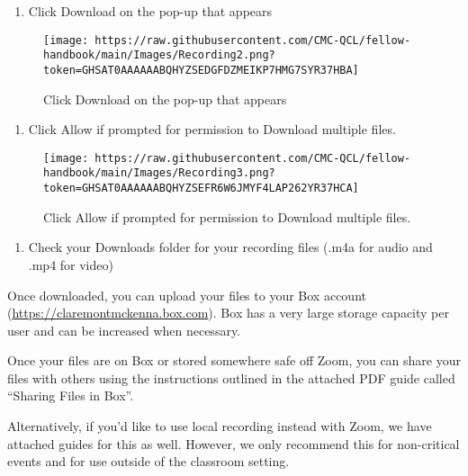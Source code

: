 \documentclass[
]{book}
\providecommand{\tightlist}{%
  \setlength{\itemsep}{0pt}\setlength{\parskip}{0pt}}
\begin{document}
\begin{enumerate}
\def\labelenumi{\arabic{enumi}.}
\setcounter{enumi}{3}
\tightlist
\item
  Click Download on the pop-up that appears
\end{enumerate}

\begin{figure}
\centering
\texttt{[image: https://raw.githubusercontent.com/CMC-QCL/fellow-handbook/main/Images/Recording2.png?token=GHSAT0AAAAAABQHYZSEDGFDZMEIKP7HMG7SYR37HBA]}
\caption{Click Download on the pop-up that appears}
\end{figure}

\begin{enumerate}
\def\labelenumi{\arabic{enumi}.}
\setcounter{enumi}{4}
\tightlist
\item
  Click Allow if prompted for permission to Download multiple files.
\end{enumerate}

\begin{figure}
\centering
\texttt{[image: https://raw.githubusercontent.com/CMC-QCL/fellow-handbook/main/Images/Recording3.png?token=GHSAT0AAAAAABQHYZSEFR6W6JMYF4LAP262YR37HCA]}
\caption{Click Allow if prompted for permission to Download multiple files.}
\end{figure}

\begin{enumerate}
\def\labelenumi{\arabic{enumi}.}
\setcounter{enumi}{5}
\tightlist
\item
  Check your Downloads folder for your recording files (.m4a for audio and .mp4 for video)
\end{enumerate}

Once downloaded, you can upload your files to your Box account (\url{https://claremontmckenna.box.com}). Box has a very large storage capacity per user and can be increased when necessary.

Once your files are on Box or stored somewhere safe off Zoom, you can share your files with others using the instructions outlined in the attached PDF guide called ``Sharing Files in Box''.

Alternatively, if you'd like to use local recording instead with Zoom, we have attached guides for this as well. However, we only recommend this for non-critical events and for use outside of the classroom setting.
\end{document}
